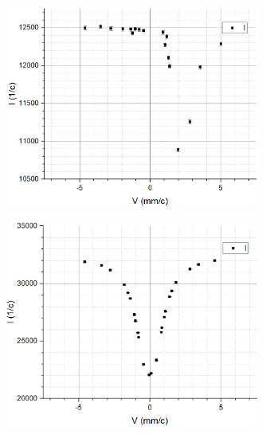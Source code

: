\documentclass[a4paper, 14pt]{extarticle}%
\begin{document}
\begin{figure}[h]
\begin{center}
\includegraphics[width=0.75\textwidth]{gr3}
\end{center}
\end{figure}


\begin{figure}[h]
\begin{center}
\includegraphics[width=0.75\textwidth]{gr4}
\end{center}
\end{figure}
\end{document}
